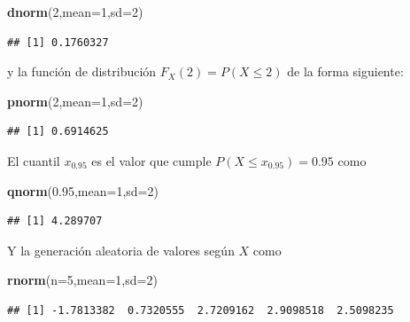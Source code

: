 \documentclass[]{book}
\newenvironment{Shaded}{\begin{snugshade}}{\end{snugshade}}
\newcommand{\DataTypeTok}[1]{\textcolor[rgb]{0.13,0.29,0.53}{#1}}
\newcommand{\DecValTok}[1]{\textcolor[rgb]{0.00,0.00,0.81}{#1}}
\newcommand{\FloatTok}[1]{\textcolor[rgb]{0.00,0.00,0.81}{#1}}
\newcommand{\KeywordTok}[1]{\textcolor[rgb]{0.13,0.29,0.53}{\textbf{#1}}}
\newcommand{\NormalTok}[1]{#1}
\begin{document}
\begin{Shaded}
\begin{Highlighting}[]
\KeywordTok{dnorm}\NormalTok{(}\DecValTok{2}\NormalTok{,}\DataTypeTok{mean=}\DecValTok{1}\NormalTok{,}\DataTypeTok{sd=}\DecValTok{2}\NormalTok{)}
\end{Highlighting}
\end{Shaded}

\begin{verbatim}
## [1] 0.1760327
\end{verbatim}

y la función de distribución \(F_X(2) = P(X\leq 2)\) de la forma siguiente:

\begin{Shaded}
\begin{Highlighting}[]
\KeywordTok{pnorm}\NormalTok{(}\DecValTok{2}\NormalTok{,}\DataTypeTok{mean=}\DecValTok{1}\NormalTok{,}\DataTypeTok{sd=}\DecValTok{2}\NormalTok{) }
\end{Highlighting}
\end{Shaded}

\begin{verbatim}
## [1] 0.6914625
\end{verbatim}

El cuantil \(x_{0.95}\) es el valor que cumple \(P(X\leq x_{0.95})=0.95\) como

\begin{Shaded}
\begin{Highlighting}[]
\KeywordTok{qnorm}\NormalTok{(}\FloatTok{0.95}\NormalTok{,}\DataTypeTok{mean=}\DecValTok{1}\NormalTok{,}\DataTypeTok{sd=}\DecValTok{2}\NormalTok{)}
\end{Highlighting}
\end{Shaded}

\begin{verbatim}
## [1] 4.289707
\end{verbatim}

Y la generación aleatoria de valores según \(X\) como

\begin{Shaded}
\begin{Highlighting}[]
\KeywordTok{rnorm}\NormalTok{(}\DataTypeTok{n=}\DecValTok{5}\NormalTok{,}\DataTypeTok{mean=}\DecValTok{1}\NormalTok{,}\DataTypeTok{sd=}\DecValTok{2}\NormalTok{)}
\end{Highlighting}
\end{Shaded}

\begin{verbatim}
## [1] -1.7813382  0.7320555  2.7209162  2.9098518  2.5098235
\end{verbatim}
\end{document}
